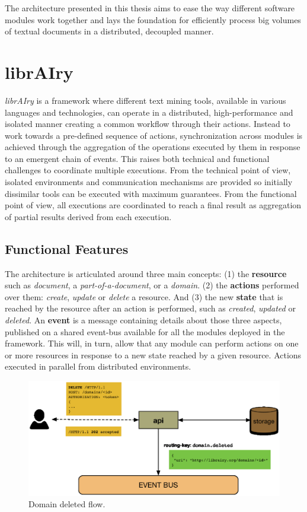 The architecture presented in this thesis aims to ease the way different software modules work together and lays the foundation for efficiently process big volumes of textual documents in a distributed, decoupled manner.

\section{librAIry}\label{sec:librairy}

\textit{librAIry} is a framework where different text mining tools, available in various languages and technologies, can operate in a distributed, high-performance and isolated manner creating a common workflow through their actions. Instead to work towards a pre-defined sequence of actions, synchronization across modules is achieved through the aggregation of the operations executed by them in response to an emergent chain of events. This raises both technical and functional challenges to coordinate multiple executions. From the technical point of view, isolated environments and communication mechanisms are provided so initially dissimilar tools can be executed with maximum guarantees. From the functional point of view, all executions are coordinated to reach a final result as aggregation of partial results derived from each execution.

\subsection{Functional Features}
The architecture is articulated around three main concepts: (1) the \textbf{resource} such as \textit{document}, a \textit{part-of-a-document}, or a \textit{domain}. (2) the \textbf{actions} performed over them: \textit{create}, \textit{update} or \textit{delete} a resource. And (3) the new \textbf{state} that is reached by the resource after an action is performed, such as  \textit{created}, \textit{updated} or \textit{deleted}. An \textbf{event} is a message containing details about those three aspects, published on a shared event-bus available for all the modules deployed in the framework. This will, in turn, allow that any module can perform actions on one or more resources in response to a new state reached by a given resource. Actions executed in parallel from distributed environments.

\begin{figure}
  \includegraphics[scale=0.35]{api-domain-deleted}
  \caption{Domain deleted flow.}
  \label{fig:librairy-domain-deleted}
\end{figure}

